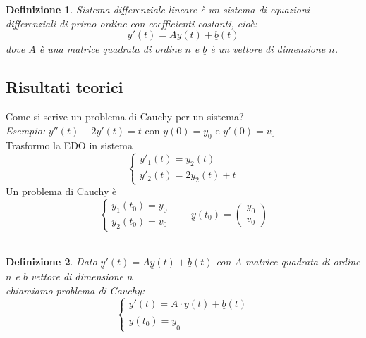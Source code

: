 \documentclass{scrreprt}
\newtheorem{defn}{Definizione}
\newenvironment{definition}{\begin{mdframed}[backgroundcolor=Ivory2]\begin{defn}}{\end{defn}\end{mdframed}}
\begin{document}


\begin{definition}
	\emph{Sistema differenziale lineare} è un sistema di equazioni differenziali di primo ordine con coefficienti costanti, cioè:
	\begin{equation}
		\underline{y'}(t) = A\underline{y}(t)+\underline{b}(t)
	\end{equation}
	dove $A$ è una matrice quadrata di ordine $n$ e $\underline{b}$ è un vettore di dimensione $n$.
\end{definition}

\subsection{Risultati teorici}
Come si scrive un problema di Cauchy per un sistema?\\
\emph{Esempio:} $y''(t)-2y'(t)=t$ con $y(0)=y_0$ e $y'(0)=v_0$\\
Trasformo la EDO in sistema
\begin{equation}
	\left\{
	\begin{array}{ll}
		y'_1(t) = y_2(t)\\
		y'_2(t) = 2y_2(t)+t
	\end{array}
	\right.
\end{equation}
Un problema di Cauchy è $$ \left\{ \begin{array}{ll} y_1(t_0) = y_0 \\ y_2(t_0)=v_0  \end{array} \right. \quad \quad \underline{y}(t_0) = \begin{pmatrix} y_0 \\ v_0 \end{pmatrix}$$\\

\begin{definition}
	Dato $\underline{y}'(t)=A\underline{y}(t)+\underline{b}(t)$ con $A$ matrice quadrata di ordine $n$ e $\underline{b}$ vettore di dimensione $n$\\
	chiamiamo problema di Cauchy: $$ \left\{ \begin{array}{ll} \underline{y}'(t) = A \cdot y(t) + \underline{b}(t) \\ \underline{y}(t_0) = \underline{y}_0  \end{array} \right.$$
\end{definition}

\end{document}
